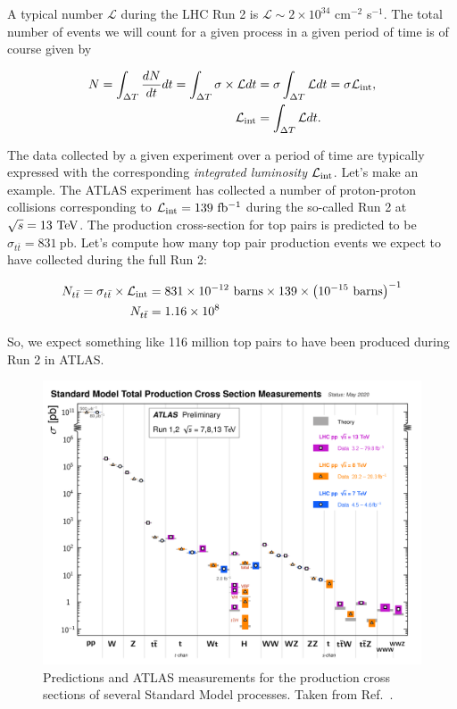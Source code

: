 A typical number $\mathcal{L}$ during the LHC Run 2 is $\mathcal{L} \sim 2\times 10^{34}$ cm$^{-2}$ s$^{-1}$. The total number of events we will count for a given process in a given period of time is of course given by 

\begin{align}
N = \int_{\Delta T} \frac{dN}{dt} dt = \int_{\Delta T} \sigma \times \mathcal{L} dt &= \sigma \int_{\Delta T} \mathcal{L} dt = \sigma \mathcal{L}_{\mathrm{int}}, \\ 
\mathcal{L}_{\mathrm{int}} &= \int_{\Delta T} \mathcal{L} dt.
\end{align}

The data collected by a given experiment over a period of time are typically expressed with the corresponding \textit{integrated luminosity} $\mathcal{L}_{\mathrm{int}}$. Let's make an example. The ATLAS experiment has collected a number of proton-proton collisions corresponding to $\Lint = 139\ \ifb$ during the so-called Run 2 at $\sqrt{s} = 13\ \text{Te\kern -0.1em V}$. The production cross-section for top pairs is predicted to be $\sigma_{t\bar{t}} = 831\ \mathrm{pb}$. Let's compute how many top pair production events we expect to have collected during the full Run 2: 

\begin{align}
N_{t\bar{t}} = \sigma_{t\bar{t}} \times \Lint &= 831 \times 10^{-12} \ \mathrm{barns} \times 139 \times \left(10^{-15}\ \mathrm{barns}\right)^{-1} \\
N_{t\bar{t}} &= 1.16\times 10^{8}
\end{align}

So, we expect something like 116 million top pairs to have been produced during Run 2 in ATLAS. 

\begin{figure}[tb] 
	\begin{center}
	\includegraphics[width=0.7\columnwidth]{Figures/SM_summary.png}
	\end{center}
	\caption{Predictions and ATLAS measurements for the production cross sections of several Standard Model processes. Taken from Ref.~\cite{SM_summary}.}
	\label{fig:SM_summary_plot}
\end{figure}


